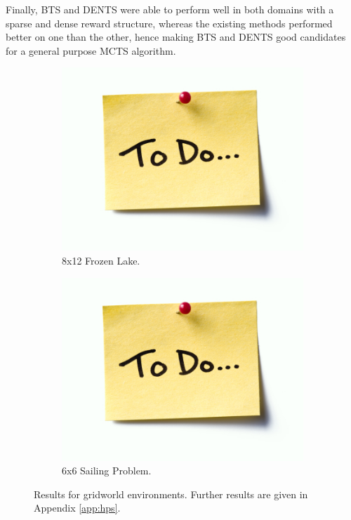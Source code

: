        Finally, BTS and DENTS were able to perform well in both domains with a sparse and dense reward structure, whereas the existing methods performed better on one than the other, hence making BTS and DENTS good candidates for a general purpose MCTS algorithm.
        
        \begin{figure}
            \centering
            \begin{subfigure}[b]{0.49\textwidth}
                \centering
                \includegraphics[width=\textwidth]{figures/todo.jpg}
                \caption{8x12 Frozen Lake.}
                \label{fig:fl}
            \end{subfigure}
            \begin{subfigure}[b]{0.49\textwidth}
                \centering
                \includegraphics[width=\textwidth]{figures/todo.jpg}
                \caption{6x6 Sailing Problem.}
                \label{fig:sp}
            \end{subfigure}
            \caption{Results for gridworld environments. Further results are given in Appendix \ref{app:hps}.}
            \label{fig:gridworld_results}
        \end{figure}
    
